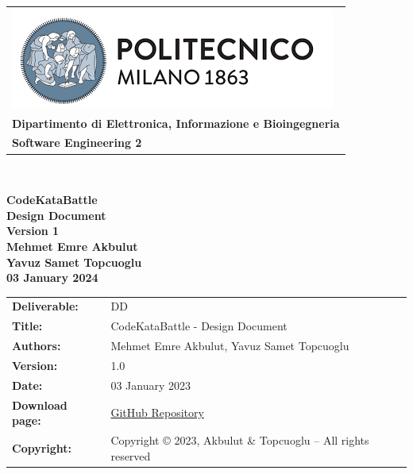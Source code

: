 \documentclass [11pt,twoside]{article}
\begin{document}

\begin{titlepage}



\begin{table}[t!]
\centering
\begin{tabu} to \textwidth { X[c] }
\includegraphics[scale=0.5]{Images/PolimiLogo} \\
\textbf{\small{Dipartimento di Elettronica, Informazione e Bioingegneria}} \\ 
\textbf{\small{Software Engineering 2}} \\
\end{tabu}
\end{table} ~
\\ [4cm]


\begin{center}
{\textbf{\Huge{CodeKataBattle}}} \\ 
\vspace{2mm}
{\textbf{\small{Design Document}}} \\ 
{\textbf{\footnotesize{Version 1}}} \\ [4cm]
\textbf{\small{Mehmet Emre Akbulut}} \\
\vspace{1mm}
\textbf{\small{Yavuz Samet Topcuoglu}} \\ [1cm]
\textbf{\footnotesize{03 January 2024}}
\end{center}





\end{titlepage}

\begin{table}[h!]
\begin{tabu} to \textwidth { X[0.3,r,p] X[0.7,l,p] }
\hline

\textbf{Deliverable:} & DD\\
\textbf{Title:} & CodeKataBattle - Design Document \\
\textbf{Authors:} & Mehmet Emre Akbulut, Yavuz Samet Topcuoglu \\
\textbf{Version:} & 1.0 \\ 
\textbf{Date:} & 03 January 2023 \\
\textbf{Download page:} & \href{https://github.com/mehmetemreakbulut/AkbulutTopcuoglu}{GitHub Repository} \\
\textbf{Copyright:} & Copyright © 2023, Akbulut \& Topcuoglu – All rights reserved \\
\hline
\end{tabu}
\end{table}
\end{document}
